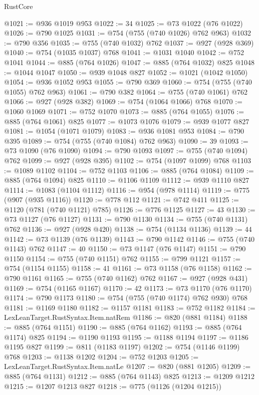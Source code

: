 \begin{lexlean}{RustCore}
\begin{coremodule}
@1021 := @936 @1019 @953
@1022 := 34
@1025 := @73 @1022 (@76 @1022)
@1026 := @790 @1025
@1031 := @754 (@755 (@740 @1026) @762 @963)
@1032 := @790 @356
@1035 := @755 (@740 @1032) @762
@1037 := @927 (@928 @369)
@1040 := @754 (@1035 @1037) @768
@1041 := @1031 @1040
@1042 := @752 @1041
@1044 := @885 (@764 @1026)
@1047 := @885 (@764 @1032) @825
@1048 := @1044 @1047
@1050 := @939 @1048 @827
@1052 := @1021 (@1042 @1050)
@1054 := @936 @1052 @953
@1055 := @790 @369
@1060 := @754 (@755 (@740 @1055) @762 @963)
@1061 := @790 @382
@1064 := @755 (@740 @1061) @762
@1066 := @927 (@928 @382)
@1069 := @754 (@1064 @1066) @768
@1070 := @1060 @1069
@1071 := @752 @1070
@1073 := @885 (@764 @1055)
@1076 := @885 (@764 @1061) @825
@1077 := @1073 @1076
@1079 := @939 @1077 @827
@1081 := @1054 (@1071 @1079)
@1083 := @936 @1081 @953
@1084 := @790 @395
@1089 := @754 (@755 (@740 @1084) @762 @963)
@1090 := 39
@1093 := @73 @1090 (@76 @1090)
@1094 := @790 @1093
@1097 := @755 (@740 @1094) @762
@1099 := @927 (@928 @395)
@1102 := @754 (@1097 @1099) @768
@1103 := @1089 @1102
@1104 := @752 @1103
@1106 := @885 (@764 @1084)
@1109 := @885 (@764 @1094) @825
@1110 := @1106 @1109
@1112 := @939 @1110 @827
@1114 := @1083 (@1104 @1112)
@1116 := @954 (@978 @1114)
@1119 := @775 (@907 (@935 @1116))
@1120 := @778 @112
@1121 := @742 @411
@1125 := @1120 (@781 (@740 @1121) @785)
@1126 := @776 @1125
@1127 := 43
@1130 := @73 @1127 (@76 @1127)
@1131 := @790 @1130
@1134 := @755 (@740 @1131) @762
@1136 := @927 (@928 @420)
@1138 := @754 (@1134 @1136)
@1139 := 44
@1142 := @73 @1139 (@76 @1139)
@1143 := @790 @1142
@1146 := @755 (@740 @1143) @762
@1147 := 40
@1150 := @73 @1147 (@76 @1147)
@1151 := @790 @1150
@1154 := @755 (@740 @1151) @762
@1155 := @799 @1121
@1157 := @754 (@1154 @1155)
@1158 := 41
@1161 := @73 @1158 (@76 @1158)
@1162 := @790 @1161
@1165 := @755 (@740 @1162) @762
@1167 := @927 (@928 @431)
@1169 := @754 (@1165 @1167)
@1170 := 42
@1173 := @73 @1170 (@76 @1170)
@1174 := @790 @1173
@1180 := @754 (@755 (@740 @1174) @762 @930) @768
@1181 := @1169 @1180
@1182 := @1157 @1181
@1183 := @752 @1182
@1184 := LexLeanTarget.RustSyntax.Item.natRem
@1186 := @820 (@881 @1184)
@1188 := @885 (@764 @1151)
@1190 := @885 (@764 @1162)
@1193 := @885 (@764 @1174) @825
@1194 := @1190 @1193
@1195 := @1188 @1194
@1197 := @1186 @1195 @827
@1199 := @811 (@1183 @1197)
@1202 := @754 (@1146 @1199) @768
@1203 := @1138 @1202
@1204 := @752 @1203
@1205 := LexLeanTarget.RustSyntax.Item.natLe
@1207 := @820 (@881 @1205)
@1209 := @885 (@764 @1131)
@1212 := @885 (@764 @1143) @825
@1213 := @1209 @1212
@1215 := @1207 @1213 @827
@1218 := @775 (@1126 (@1204 @1215))

\end{coremodule}
\end{lexlean}
